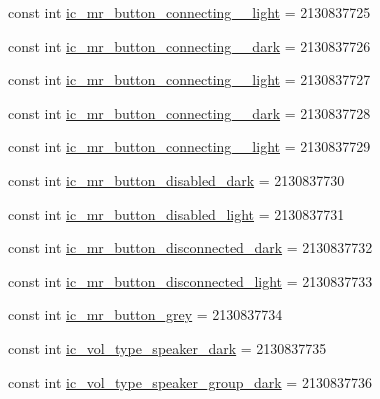 \begin{DoxyCompactItemize}
const int \mbox{\hyperlink{class_f_w_p_s___app_1_1_droid_1_1_resource_1_1_drawable_add920874314f897b884f82f0e80e20bb}{ic\+\_\+mr\+\_\+button\+\_\+connecting\+\_\+\_\+light}} = 2130837725
\item 
const int \mbox{\hyperlink{class_f_w_p_s___app_1_1_droid_1_1_resource_1_1_drawable_ab69103a59c89e98f00a44511c94e3544}{ic\+\_\+mr\+\_\+button\+\_\+connecting\+\_\+\_\+dark}} = 2130837726
\item 
const int \mbox{\hyperlink{class_f_w_p_s___app_1_1_droid_1_1_resource_1_1_drawable_a0842fde0ecd0f4d407dee186d1ef17c9}{ic\+\_\+mr\+\_\+button\+\_\+connecting\+\_\+\_\+light}} = 2130837727
\item 
const int \mbox{\hyperlink{class_f_w_p_s___app_1_1_droid_1_1_resource_1_1_drawable_afce48896588ac7c9261e2ba2bf5f7fca}{ic\+\_\+mr\+\_\+button\+\_\+connecting\+\_\+\_\+dark}} = 2130837728
\item 
const int \mbox{\hyperlink{class_f_w_p_s___app_1_1_droid_1_1_resource_1_1_drawable_a8d311c8299b47dd3c2a33f94d663cf2b}{ic\+\_\+mr\+\_\+button\+\_\+connecting\+\_\+\_\+light}} = 2130837729
\item 
const int \mbox{\hyperlink{class_f_w_p_s___app_1_1_droid_1_1_resource_1_1_drawable_a6aeb5ce1078f88e7562e7beb36b64189}{ic\+\_\+mr\+\_\+button\+\_\+disabled\+\_\+dark}} = 2130837730
\item 
const int \mbox{\hyperlink{class_f_w_p_s___app_1_1_droid_1_1_resource_1_1_drawable_a6014b4e55242dbb9029111898de7fe48}{ic\+\_\+mr\+\_\+button\+\_\+disabled\+\_\+light}} = 2130837731
\item 
const int \mbox{\hyperlink{class_f_w_p_s___app_1_1_droid_1_1_resource_1_1_drawable_ad5751be5da95ca2c22be15004b8165fb}{ic\+\_\+mr\+\_\+button\+\_\+disconnected\+\_\+dark}} = 2130837732
\item 
const int \mbox{\hyperlink{class_f_w_p_s___app_1_1_droid_1_1_resource_1_1_drawable_a119a1429b981940b72c9bce8544f1e19}{ic\+\_\+mr\+\_\+button\+\_\+disconnected\+\_\+light}} = 2130837733
\item 
const int \mbox{\hyperlink{class_f_w_p_s___app_1_1_droid_1_1_resource_1_1_drawable_a744e04689907382d0d83102c563f2eeb}{ic\+\_\+mr\+\_\+button\+\_\+grey}} = 2130837734
\item 
const int \mbox{\hyperlink{class_f_w_p_s___app_1_1_droid_1_1_resource_1_1_drawable_a8f450f9a023af556c5c3c15c6c8695f0}{ic\+\_\+vol\+\_\+type\+\_\+speaker\+\_\+dark}} = 2130837735
\item 
const int \mbox{\hyperlink{class_f_w_p_s___app_1_1_droid_1_1_resource_1_1_drawable_a4b77b35a9486ad0c2022f2c67c053201}{ic\+\_\+vol\+\_\+type\+\_\+speaker\+\_\+group\+\_\+dark}} = 2130837736

\end{DoxyCompactItemize}
